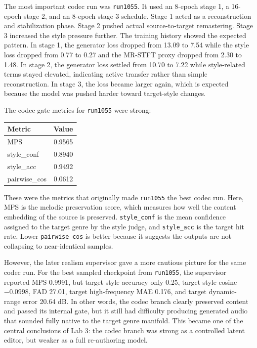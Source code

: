 \documentclass[11pt]{article}
\begin{document}
The most important codec run was \texttt{run1055}. It used an 8-epoch stage 1, a 16-epoch stage 2, and an 8-epoch stage 3 schedule. Stage 1 acted as a reconstruction and stabilization phase. Stage 2 pushed actual source-to-target remastering. Stage 3 increased the style pressure further. The training history showed the expected pattern. In stage 1, the generator loss dropped from 13.09 to 7.54 while the style loss dropped from 0.77 to 0.27 and the MR-STFT proxy dropped from 2.30 to 1.48. In stage 2, the generator loss settled from 10.70 to 7.22 while style-related terms stayed elevated, indicating active transfer rather than simple reconstruction. In stage 3, the loss became larger again, which is expected because the model was pushed harder toward target-style changes.

The codec gate metrics for \texttt{run1055} were strong:
\begin{center}
\begin{tabular}{>{\raggedright\arraybackslash}p{1.8in}r}
\toprule
Metric & Value \\
\midrule
MPS & 0.9565 \\
style\_conf & 0.8940 \\
style\_acc & 0.9492 \\
pairwise\_cos & 0.0612 \\
\bottomrule
\end{tabular}
\end{center}

These were the metrics that originally made \texttt{run1055} the best codec run. Here, MPS is the melodic preservation score, which measures how well the content embedding of the source is preserved. \texttt{style\_conf} is the mean confidence assigned to the target genre by the style judge, and \texttt{style\_acc} is the target hit rate. Lower \texttt{pairwise\_cos} is better because it suggests the outputs are not collapsing to near-identical samples.

However, the later realism supervisor gave a more cautious picture for the same codec run. For the best sampled checkpoint from \texttt{run1055}, the supervisor reported MPS 0.9991, but target-style accuracy only 0.25, target-style cosine \(-0.0998\), FAD 27.01, target high-frequency MAE 0.176, and target dynamic-range error 20.64 dB. In other words, the codec branch clearly preserved content and passed its internal gate, but it still had difficulty producing generated audio that sounded fully native to the target genre manifold. This became one of the central conclusions of Lab 3: the codec branch was strong as a controlled latent editor, but weaker as a full re-authoring model.
\end{document}
